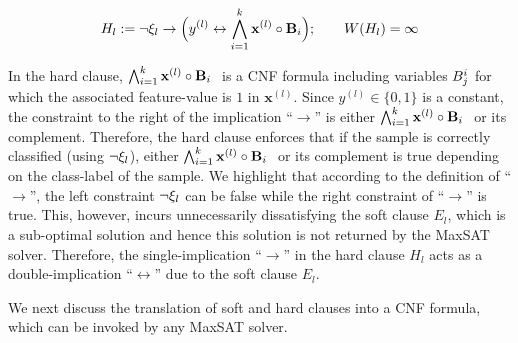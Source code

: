 \begin{itemize}
	\begin{equation}
			\label{interpretability_imli_hard_clause_rule_consistency}
		H_l:= \neg \xi_l \rightarrow \Big(y^{(l)}\leftrightarrow \bigwedge_{i=1}^k {\mathbf{x}^{(l)}} \circ {\ensuremath{\mathbf{B}}_{i}}\Big); \qquad  W \! \left( H_l \right)=\infty
	\end{equation}
	
	In the hard clause, $ \bigwedge_{i=1}^k {\mathbf{x}^{(l)}} \circ {\ensuremath{\mathbf{B}}_{i}}\ $ is a CNF formula including variables $ B_j^i $ for which the associated  feature-value is $ 1 $ in  $ \mathbf{x}^{(l)} $. Since $ y^{(l)} \in \{0,1\} $ is a constant, the constraint to the right of the implication ``$ \rightarrow $'' is either  $ \bigwedge_{i=1}^k {\mathbf{x}^{(l)}} \circ {\ensuremath{\mathbf{B}}_{i}}\ $ or its complement. Therefore, the hard clause enforces that if the sample is correctly classified (using $ \neg \xi_l $), either  $ \bigwedge_{i=1}^k {\mathbf{x}^{(l)}} \circ {\ensuremath{\mathbf{B}}_{i}}\ $ or its complement is true depending on the class-label of the sample.  We highlight that according to the definition of ``$ \rightarrow $'', the left constraint $ \neg \xi_l $ can  be false while the right constraint of 	``$ \rightarrow $'' is true.  This, however, incurs unnecessarily dissatisfying the soft clause $ E_l $, which is a sub-optimal solution and hence this solution is not returned by the MaxSAT solver. Therefore, the single-implication ``$ \rightarrow $'' in the hard clause $ H_l $ acts as a double-implication ``$ \leftrightarrow $''  due to the soft clause $ E_l $. 
	

	


\end{itemize}

	  We next discuss the translation of soft and hard clauses into a CNF formula, which can be invoked by any MaxSAT solver. 


